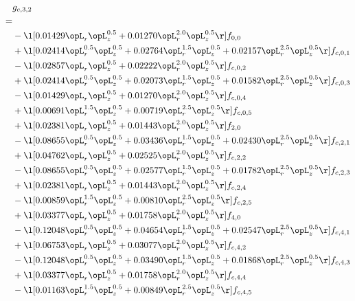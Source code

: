 \begin{alignat}{2} 
\label{eq:g_32_0} 
& g_{c,3,2} \nonumber \\ 
 = \\ 
& - \l[  0.01429 \opL_r \opL_z^{0.5} +  0.01270 \opL_r^{2.0} \opL_z^{0.5}  \r] f_{0,0} \nonumber \\ 
& + \l[  0.02414 \opL_r^{0.5} \opL_z^{0.5} +  0.02764 \opL_r^{1.5} \opL_z^{0.5} +  0.02157 \opL_r^{2.5} \opL_z^{0.5}  \r] f_{c,0,1} \nonumber \\ 
& - \l[  0.02857 \opL_r \opL_z^{0.5} +  0.02222 \opL_r^{2.0} \opL_z^{0.5}  \r] f_{c,0,2} \nonumber \\ 
& + \l[  0.02414 \opL_r^{0.5} \opL_z^{0.5} +  0.02073 \opL_r^{1.5} \opL_z^{0.5} +  0.01582 \opL_r^{2.5} \opL_z^{0.5}  \r] f_{c,0,3} \nonumber \\ 
& - \l[  0.01429 \opL_r \opL_z^{0.5} +  0.01270 \opL_r^{2.0} \opL_z^{0.5}  \r] f_{c,0,4} \nonumber \\ 
& + \l[  0.00691 \opL_r^{1.5} \opL_z^{0.5} +  0.00719 \opL_r^{2.5} \opL_z^{0.5}  \r] f_{c,0,5} \nonumber \\ 
& + \l[  0.02381 \opL_r \opL_z^{0.5} +  0.01443 \opL_r^{2.0} \opL_z^{0.5}  \r] f_{2,0} \nonumber \\ 
& - \l[  0.08655 \opL_r^{0.5} \opL_z^{0.5} +  0.03436 \opL_r^{1.5} \opL_z^{0.5} +  0.02430 \opL_r^{2.5} \opL_z^{0.5}  \r] f_{c,2,1} \nonumber \\ 
& + \l[  0.04762 \opL_r \opL_z^{0.5} +  0.02525 \opL_r^{2.0} \opL_z^{0.5}  \r] f_{c,2,2} \nonumber \\ 
& - \l[  0.08655 \opL_r^{0.5} \opL_z^{0.5} +  0.02577 \opL_r^{1.5} \opL_z^{0.5} +  0.01782 \opL_r^{2.5} \opL_z^{0.5}  \r] f_{c,2,3} \nonumber \\ 
& + \l[  0.02381 \opL_r \opL_z^{0.5} +  0.01443 \opL_r^{2.0} \opL_z^{0.5}  \r] f_{c,2,4} \nonumber \\ 
& - \l[  0.00859 \opL_r^{1.5} \opL_z^{0.5} +  0.00810 \opL_r^{2.5} \opL_z^{0.5}  \r] f_{c,2,5} \nonumber \\ 
& + \l[  0.03377 \opL_r \opL_z^{0.5} +  0.01758 \opL_r^{2.0} \opL_z^{0.5}  \r] f_{4,0} \nonumber \\ 
& - \l[  0.12048 \opL_r^{0.5} \opL_z^{0.5} +  0.04654 \opL_r^{1.5} \opL_z^{0.5} +  0.02547 \opL_r^{2.5} \opL_z^{0.5}  \r] f_{c,4,1} \nonumber \\ 
& + \l[  0.06753 \opL_r \opL_z^{0.5} +  0.03077 \opL_r^{2.0} \opL_z^{0.5}  \r] f_{c,4,2} \nonumber \\ 
& - \l[  0.12048 \opL_r^{0.5} \opL_z^{0.5} +  0.03490 \opL_r^{1.5} \opL_z^{0.5} +  0.01868 \opL_r^{2.5} \opL_z^{0.5}  \r] f_{c,4,3} \nonumber \\ 
& + \l[  0.03377 \opL_r \opL_z^{0.5} +  0.01758 \opL_r^{2.0} \opL_z^{0.5}  \r] f_{c,4,4} \nonumber \\ 
& - \l[  0.01163 \opL_r^{1.5} \opL_z^{0.5} +  0.00849 \opL_r^{2.5} \opL_z^{0.5}  \r] f_{c,4,5} \nonumber \\ 
\end{alignat} 


